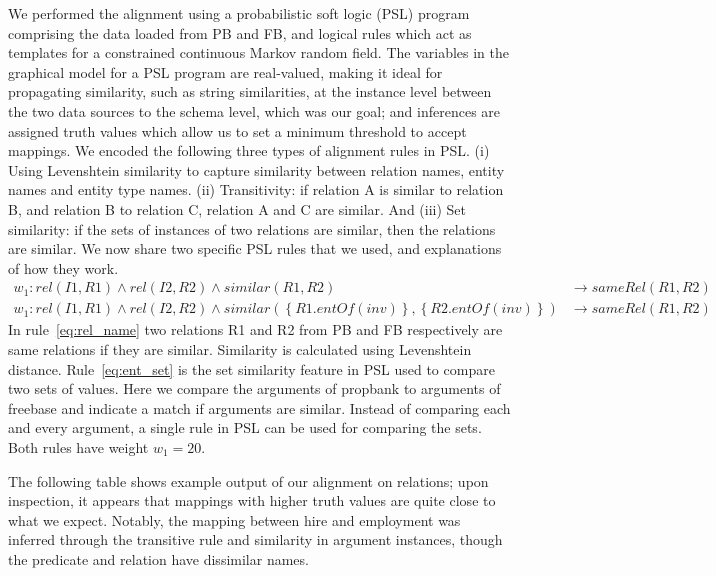 We performed the alignment using a probabilistic soft logic (PSL) program~\cite{brocheler_probabilistic_2012} comprising the data loaded from PB and FB, and logical rules which act as templates for a constrained continuous Markov random field.
The variables in the graphical model for a PSL program are real-valued, making it ideal for propagating similarity, such as string similarities, at the instance level between the two data sources to the schema level, which was our goal; and inferences are assigned truth values which allow us to set a minimum threshold to accept mappings.
We encoded the following three types of alignment rules in PSL.
(i) Using Levenshtein similarity to capture similarity between relation names, entity names and entity type names.
(ii) Transitivity:  if relation A is similar to relation B, and relation B to relation C, relation A and C are similar.
And (iii) Set similarity:  if the sets of instances of two relations are similar, then the relations are similar.
We now share two specific PSL rules that we used, and explanations of how they work.
\begin{align}
w_{1}: rel(I1,R1)\wedge rel(I2,R2) \wedge similar(R1,R2)&\rightarrow sameRel(R1,R2) \label{eq:rel_name}\\
w_{1}: rel(I1,R1)\wedge rel(I2,R2) \wedge similar(\left\{R1.entOf(inv)\right\},\left\{R2.entOf(inv)\right\}) &\rightarrow sameRel(R1, R2) \label{eq:ent_set}
\end{align}
In rule~\eqref{eq:rel_name} two relations R1 and R2 from PB and FB respectively are same relations if they are similar. Similarity is calculated using Levenshtein distance.
Rule~\eqref{eq:ent_set} is the set similarity feature in PSL used to compare two sets of values.
Here we compare the arguments of propbank to arguments of freebase and indicate a match if arguments are similar.
Instead of comparing each and every argument, a single rule in PSL can be used for comparing the sets.
Both rules have weight $w_1 = 20$.

The following table shows example output of our alignment on relations; upon inspection, it appears that mappings with higher truth values are quite close to what we expect.
Notably, the mapping between hire and employment was inferred through the transitive rule and similarity in argument instances, though the predicate and relation have dissimilar names.

